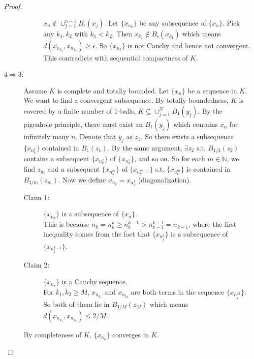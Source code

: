 \documentclass[12pt]{article}
\theoremstyle{plain}
\theoremstyle{definition}
\begin{document}
\begin{proof}
\begin{description}
\begin{description}
                    $x_n\notin\cup_{j=1}^{n-1}B_\epsilon(x_j)$.
                    Let $\{x_{n_k}\}$ be any subsequence of $\{x_n\}$.
                    Pick any $k_1, k_2$ with $k_1<k_2$.
                    Then $x_{k_2}\notin B_\epsilon(x_{k_1})$ which means
                    $d(x_{n_{k_1}},x_{n_{k_2}})\geq \epsilon$.
                    So $\{x_{n_k}\}$  is not Cauchy and hence not convergent.
                    This contradicts with sequential compactness of $K$.
            \end{description}
        \item[$4\Rightarrow 3$:]
            Assume $K$ is complete and totally bounded.
            Let $\{x_n\}$ be a sequence in $K$.
            We want to find a convergent subsequence.
            By totally boundedness, $K$ is covered by a finite number of
            $1$-balls, $K\subseteq\cup_{j=1}^N B_1(y_j)$.
            By the pigenhole principle, there must exist an $B_1(y_j)$ which
            contains $x_n$ for infinitely many $n$.
            Denote that $y_j$ as $z_1$.
            So there exists a subsequence $\{x_{n_k^1}\}$ contained in
            $B_1(z_1)$.
            By the same argument, $\exists z_2$ s.t. $B_{1/2}(z_2)$ contains a
            subsequent $\{x_{n_k^2}\}$ of $\{x_{n_k^1}\}$, and so on.
            So for each $m\in\mathbb{N}$, we find $z_m$ and a subsequent
            $\{x_{n_k^m}\}$ of $\{x_{n_k^{m-1}}\}$ s.t. $\{x_{n_k^m}\}$ is
            contained in $B_{1/m}(z_m)$.
            Now we define $x_{n_k}=x_{n_k^k}$ (diagonalization).
            \begin{description}
                \item [Claim 1:]
                    $\{x_{n_k}\}$ is a subsequence of $\{x_n\}$.\\
                    This is because $n_k=n_k^k\geq
                    n_k^{k-1}>n_{k-1}^{k-1}=n_{k-1}$, where the first inequality
                    comes from the fact that $\{x_{n_j^k}\}$ is a subsequence of
                    $\{x_{n_j^{k-1}}\}$.
                \item [Claim 2:]
                    $\{x_{n_k}\}$ is a Cauchy sequence.\\
                    For $k_1, k_2\geq M$, $x_{n_{k_1}}$ and $x_{n_{k_2}}$ are
                    both terms in the sequence $\{x_{n_j^M}\}$.
                    So both of them lie in $B_{1/M}(z_M)$ which means
                    $d(x_{n_{k_1}},x_{n_{k_2}})\leq 2/M$.
            \end{description}
            By completeness of $K$, $\{x_{n_k}\}$ converges in $K$.

\end{description}
\end{proof}
\end{document}
